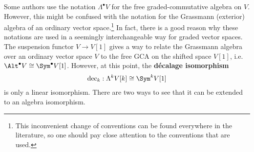     \begin{remark}\label{hda:decalage}
        Some authors use the notation $\Lambda^\bullet V$ for the free graded-commutative algebra on $V$. However, this might be confused with the notation for the Grassmann (exterior) algebra of an ordinary vector space.\footnote{This inconvenient change of conventions can be found everywhere in the literature, so one should pay close attention to the conventions that are used.} In fact, there is a good reason why these notations are used in a seemingly interchangeable way for graded vector spaces. The suspension functor $V\rightarrow V[1]$ gives a way to relate the Grassmann algebra over an ordinary vector space $V$ to the free GCA on the shifted space $V[1]$, i.e.~$\Alt^\bullet V\cong\Sym^\bullet V[1]$. However, at this point, the \textbf{d\'ecalage isomorphism}
        \begin{gather}
            \mathrm{dec}_k:\Lambda^kV[k]\cong\Sym^kV[1]
        \end{gather}
        is only a linear isomorphism. There are two ways to see that it can be extended to an algebra isomorphism.


\end{remark}
